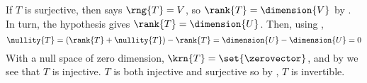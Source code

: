 If $T$ is surjective, then  says $\rng{T}=V$, so $\rank{T}=\dimension{V}$ by .  In turn, the hypothesis gives $\rank{T}=\dimension{U}$.  Then, using ,
%
\begin{equation*}
\nullity{T}=\left(\rank{T}+\nullity{T}\right)-\rank{T}=\dimension{U}-\dimension{U}=0
\end{equation*}
%
With a null space of zero dimension, $\krn{T}=\set{\zerovector}$, and by  we see that $T$ is injective.  $T$ is both injective and surjective so by , $T$ is invertible.
